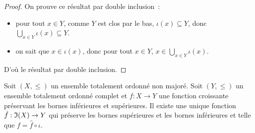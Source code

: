 \begin{proof}
  On prouve ce résultat par double inclusion~:
  \begin{itemize}
  \item pour tout $x\in Y$, comme $Y$ est clos par le bas,
    $\iota(x)\subseteq Y$, donc
    $\displaystyle\bigcup_{x\in Y}\iota(x)\subseteq Y$.
  \item on sait que $x\in \iota(x)$, donc pour tout $x\in Y$,
    $\displaystyle x\in \bigcup_{x\in Y} \iota(x)$.
  \end{itemize}
  D'où le résultat par double inclusion.
\end{proof}

\begin{theorem}
  Soit $(X,\leq)$ un ensemble totalement ordonné non majoré. Soit $(Y,\leq)$
  un ensemble totalement ordonné complet et $f : X \to Y$ une fonction
  croissante préservant les bornes inférieures et supérieures. Il existe une
  unique fonction $\hat f : \mathfrak{I}(X) \to Y$ qui préserve les bornes supérieures
  et les bornes inférieures et telle que $f = \hat f \circ \iota$.
\end{theorem}

